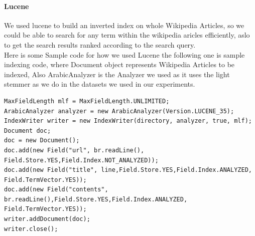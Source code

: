 \paragraph{Lucene}
We used lucene to build an inverted index on whole Wikipedia Articles, so we could be able to search for any term within the wikipedia aricles efficiently, aslo to get the search results ranked according to the search query.\\
Here is some Sample code for how we used Lucene the following one is sample indexing code, where Document object represents Wikipedia Articles to be indexed, Also ArabicAnalyzer is the Analyzer we used as it uses the light stemmer as we do in the datasets we used in our experiments.\\

\begin{lstlisting}
MaxFieldLength mlf = MaxFieldLength.UNLIMITED;
ArabicAnalyzer analyzer = new ArabicAnalyzer(Version.LUCENE_35);
IndexWriter writer = new IndexWriter(directory, analyzer, true, mlf);
Document doc;
doc = new Document();
doc.add(new Field("url", br.readLine(),	Field.Store.YES,Field.Index.NOT_ANALYZED));
doc.add(new Field("title", line,Field.Store.YES,Field.Index.ANALYZED, Field.TermVector.YES));
doc.add(new Field("contents", br.readLine(),Field.Store.YES,Field.Index.ANALYZED, Field.TermVector.YES));
writer.addDocument(doc);
writer.close();
\end{lstlisting}

